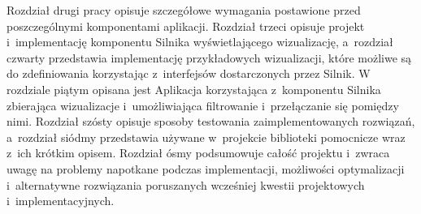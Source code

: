 Rozdział drugi pracy opisuje szczegółowe wymagania postawione przed poszczególnymi komponentami aplikacji. Rozdział trzeci opisuje projekt i~implementację komponentu Silnika wyświetlającego wizualizację, a~rozdział czwarty przedstawia implementację przykładowych wizualizacji, które możliwe są do zdefiniowania korzystając z~interfejsów dostarczonych przez Silnik. W rozdziale piątym opisana jest Aplikacja korzystająca z~komponentu Silnika zbierająca wizualizacje i~umożliwiająca filtrowanie i~przełączanie się pomiędzy nimi. Rozdział szósty opisuje sposoby testowania zaimplementowanych rozwiązań, a~rozdział siódmy przedstawia używane w~projekcie biblioteki pomocnicze wraz z~ich krótkim opisem. Rozdział ósmy podsumowuje całość projektu i~zwraca uwagę na problemy napotkane podczas implementacji, możliwości optymalizacji i~alternatywne rozwiązania poruszanych wcześniej kwestii projektowych i~implementacyjnych.